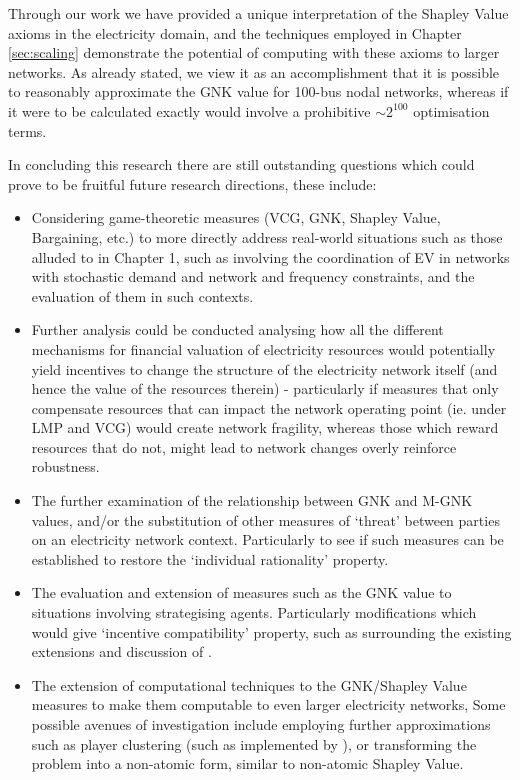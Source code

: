 Through our work we have provided a unique interpretation of the Shapley Value axioms in the electricity domain, and the techniques employed in Chapter \ref{sec:scaling} demonstrate the potential of computing with these axioms to larger networks. As already stated, we view it as an accomplishment that it is possible to reasonably approximate the GNK value for 100-bus nodal networks,
whereas if it were to be calculated exactly would involve a prohibitive $\sim 2^{100}$ optimisation terms.

In concluding this research there are still outstanding questions which could prove to be fruitful future research directions, these include:
\begin{itemize}
\item	Considering game-theoretic measures (VCG, GNK, Shapley Value, Bargaining, etc.) to more directly address real-world situations such as those alluded to in Chapter 1, such as involving the coordination of EV in networks with stochastic demand and network and frequency constraints, and the evaluation of them in such contexts.
\item	Further analysis could be conducted analysing how all the different mechanisms for financial valuation of electricity resources would potentially yield incentives to change the structure of the electricity network itself (and hence the value of the resources therein) - particularly if measures that only compensate resources that can impact the network operating point (ie. under LMP and VCG) would create network fragility, whereas those which reward resources that do not, might lead to network changes overly reinforce robustness.
\item	The further examination of the relationship between GNK and M-GNK values, and/or the substitution of other measures of `threat' between parties on an electricity network context. Particularly to see if such measures can be established to restore the `individual rationality' property.
\item	The evaluation and extension of measures such as the GNK value to situations involving strategising agents. Particularly modifications which would give `incentive compatibility' property, such as surrounding the existing extensions and discussion of \cite{myerson1,Salamanca2019}.
\item	The extension of computational techniques to the GNK/Shapley Value measures to make them computable to even larger electricity networks, Some possible avenues of investigation include employing further approximations such as player clustering (such as implemented by \cite{DBLP:journals/corr/abs-1903-10965}), or transforming the problem into a non-atomic form, similar to non-atomic Shapley Value.

\end{itemize}

